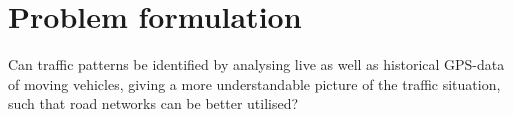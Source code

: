 \section{Problem formulation}
Can traffic patterns be identified by analysing live as well as historical GPS-data of moving vehicles, giving a more understandable picture of the traffic situation, such that road networks can be better utilised?